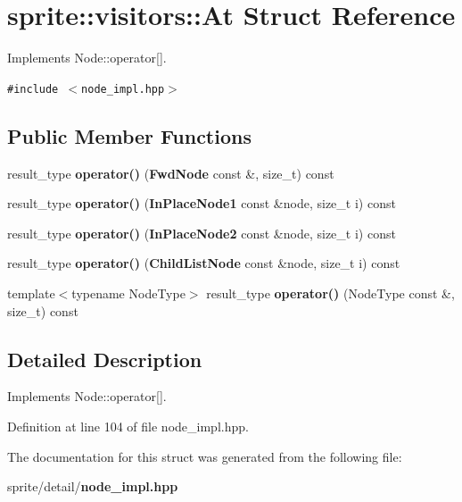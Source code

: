 \section{sprite::visitors::At Struct Reference}
\label{structsprite_1_1visitors_1_1At}
Implements Node::operator[].  


{\tt \#include $<$node\_\-impl.hpp$>$}

\subsection*{Public Member Functions}
\begin{CompactItemize}
\item 
result\_\-type {\bf operator()} ({\bf Fwd\-Node} const \&, size\_\-t) const \label{structsprite_1_1visitors_1_1At_a0}

\item 
result\_\-type {\bf operator()} ({\bf In\-Place\-Node1} const \&node, size\_\-t i) const \label{structsprite_1_1visitors_1_1At_a1}

\item 
result\_\-type {\bf operator()} ({\bf In\-Place\-Node2} const \&node, size\_\-t i) const \label{structsprite_1_1visitors_1_1At_a2}

\item 
result\_\-type {\bf operator()} ({\bf Child\-List\-Node} const \&node, size\_\-t i) const \label{structsprite_1_1visitors_1_1At_a3}

\item 
template$<$typename Node\-Type$>$ result\_\-type {\bf operator()} (Node\-Type const \&, size\_\-t) const \label{structsprite_1_1visitors_1_1At_a4}

\end{CompactItemize}


\subsection{Detailed Description}
Implements Node::operator[]. 



Definition at line 104 of file node\_\-impl.hpp.

The documentation for this struct was generated from the following file:\begin{CompactItemize}
\item 
sprite/detail/{\bf node\_\-impl.hpp}\end{CompactItemize}
